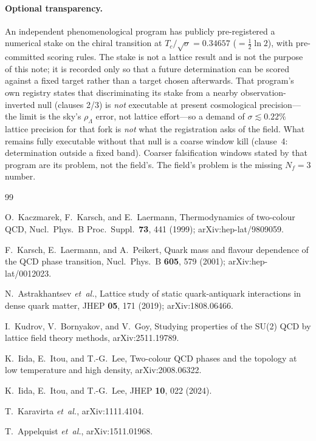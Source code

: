\documentclass[aps,prd,twocolumn,superscriptaddress,nofootinbib,10pt]{revtex4-2}
\begin{document}
\paragraph{Optional transparency.}
An independent phenomenological program has publicly pre-registered a numerical stake on the
chiral transition at $T_c/\sqrt{\sigma}=0.34657$ ($=\tfrac12\ln 2$), with pre-committed scoring
rules. The stake is not a lattice result and is not the purpose of this note; it is recorded only
so that a future determination can be scored against a fixed target rather than a target chosen
afterwards. That program's own registry states that discriminating its stake from a nearby
observation-inverted null (clauses 2/3) is \emph{not} executable at present cosmological
precision---the limit is the sky's $\rho_\Lambda$ error, not lattice effort---so a demand of
$\sigma\lesssim 0.22\%$ lattice precision for that fork is \emph{not} what the registration
asks of the field. What remains fully executable without that null is a coarse window kill
(clause~4: determination outside a fixed band). Coarser falsification windows stated by that
program are its problem, not the field's. The field's problem is the missing $N_f=3$ number.

\begin{thebibliography}{99}

O.~Kaczmarek, F.~Karsch, and E.~Laermann,
Thermodynamics of two-colour QCD,
Nucl.\ Phys.\ B Proc.\ Suppl.\ \textbf{73}, 441 (1999);
arXiv:hep-lat/9809059.

F.~Karsch, E.~Laermann, and A.~Peikert,
Quark mass and flavour dependence of the QCD phase transition,
Nucl.\ Phys.\ B \textbf{605}, 579 (2001);
arXiv:hep-lat/0012023.

N.~Astrakhantsev \emph{et~al.},
Lattice study of static quark-antiquark interactions in dense quark matter,
JHEP \textbf{05}, 171 (2019);
arXiv:1808.06466.

I.~Kudrov, V.~Bornyakov, and V.~Goy,
Studying properties of the SU(2) QCD by lattice field theory methods,
arXiv:2511.19789.

K.~Iida, E.~Itou, and T.-G.~Lee,
Two-colour QCD phases and the topology at low temperature and high density,
arXiv:2008.06322.

K.~Iida, E.~Itou, and T.-G.~Lee,
JHEP \textbf{10}, 022 (2024).

T.~Karavirta \emph{et~al.},
arXiv:1111.4104.

T.~Appelquist \emph{et~al.},
arXiv:1511.01968.

\end{thebibliography}
\end{document}
